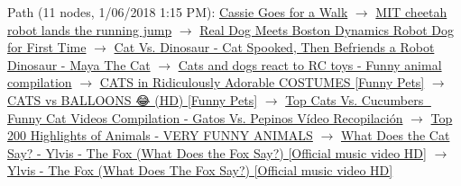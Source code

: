 \documentclass[12 pt]{article}
\begin{document}
	\noindent Path (11 nodes, 1/06/2018 1:15 PM):
	\href{https://www.youtube.com/watch?v=wXvzlTPAkMo}{Cassie Goes for a Walk} $\rightarrow$
	\href{https://www.youtube.com/watch?v=_luhn7TLfWU}{MIT cheetah robot lands the running jump} $\rightarrow$
	\href{https://www.youtube.com/watch?v=rEg6oeazTNY}{Real Dog Meets Boston Dynamics Robot Dog for First Time} $\rightarrow$
	\href{https://www.youtube.com/watch?v=W0khUGNfCIE}{Cat Vs. Dinosaur - Cat Spooked, Then Befriends a Robot Dinosaur - Maya The Cat} $\rightarrow$
	\href{https://www.youtube.com/watch?v=HsdECUXMnJs}{Cats and dogs react to RC toys - Funny animal compilation} $\rightarrow$
	\href{https://www.youtube.com/watch?v=6NmA0Uq2qho}{CATS in Ridiculously Adorable COSTUMES [Funny Pets]} $\rightarrow$
	\href{https://www.youtube.com/watch?v=zlSNrEcB3SA}{CATS vs BALLOONS 😂 (HD) [Funny Pets]} $\rightarrow$
	\href{https://www.youtube.com/watch?v=DXRkXmEK44U}{Top Cats Vs. Cucumbers 🔴 Funny Cat Videos Compilation - Gatos Vs. Pepinos Vídeo Recopilación} $\rightarrow$
	\href{https://www.youtube.com/watch?v=xO8Cz-9qKTI}{Top 200 Highlights of Animals - VERY FUNNY ANIMALS} $\rightarrow$
	\href{https://www.youtube.com/watch?v=xPMPvAPiy3g}{What Does the Cat Say? - Ylvis - The Fox (What Does the Fox Say?) [Official music video HD]} $\rightarrow$
	\href{https://www.youtube.com/watch?v=jofNR_WkoCE}{Ylvis - The Fox (What Does The Fox Say?) [Official music video HD]}\\
\end{document}
